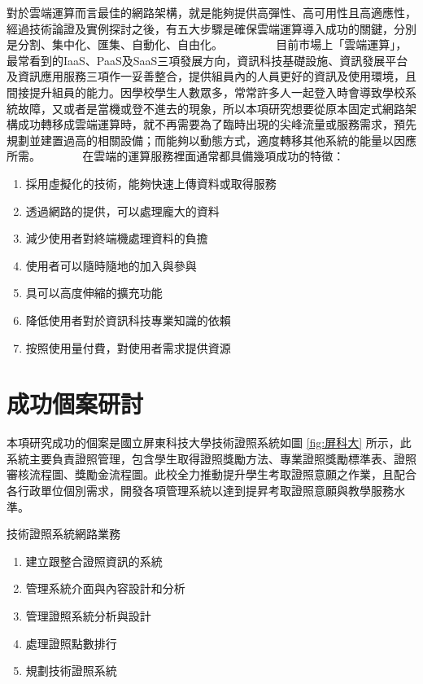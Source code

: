對於雲端運算而言最佳的網路架構，就是能夠提供高彈性、高可用性且高適應性，經過技術論證及實例探討之後，有五大步驟是確保雲端運算導入成功的關鍵，分別是分割、集中化、匯集、自動化、自由化。 
　　　　 
目前市場上「雲端運算」，最常看到的IaaS、PaaS及SaaS三項發展方向，資訊科技基礎設施、資訊發展平台及資訊應用服務三項作一妥善整合，提供組員內的人員更好的資訊及使用環境，且間接提升組員的能力。因學校學生人數眾多，常常許多人一起登入時會導致學校系統故障，又或者是當機或登不進去的現象，所以本項研究想要從原本固定式網路架構成功轉移成雲端運算時，就不再需要為了臨時出現的尖峰流量或服務需求，預先規劃並建置過高的相關設備；而能夠以動態方式，適度轉移其他系統的能量以因應所需。
　　　
在雲端的運算服務裡面通常都具備幾項成功的特徵：

\begin{enumerate}[noitemsep]
\item 採用虛擬化的技術，能夠快速上傳資料或取得服務
\item 透過網路的提供，可以處理龐大的資料
\item 減少使用者對終端機處理資料的負擔
\item 使用者可以隨時隨地的加入與參與
\item 具可以高度伸縮的擴充功能
\item 降低使用者對於資訊科技專業知識的依賴
\item 按照使用量付費，對使用者需求提供資源
\end{enumerate}


  \section{成功個案研討}

本項研究成功的個案是國立屏東科技大學技術證照系統如圖 \ref{fig:屏科大} 所示，此系統主要負責證照管理，包含學生取得證照獎勵方法、專業證照獎勵標準表、證照審核流程圖、獎勵金流程圖。此校全力推動提升學生考取證照意願之作業，且配合各行政單位個別需求，開發各項管理系統以達到提昇考取證照意願與教學服務水準。

技術證照系統網路業務

\begin{enumerate}[noitemsep]
\item 建立跟整合證照資訊的系統
\item 管理系統介面與內容設計和分析
\item 管理證照系統分析與設計
\item 處理證照點數排行
\item 規劃技術證照系統 
\end{enumerate}

